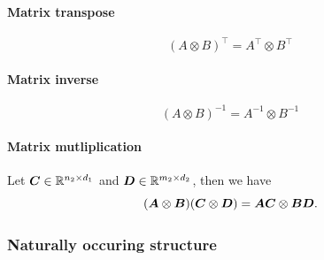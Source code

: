 \paragraph{Matrix transpose}
$$ (A \otimes B)^{\top} = A^{\top} \otimes B^{\top} $$

\paragraph{Matrix inverse}
$$ (A \otimes B)^{-1} = A^{-1} \otimes B^{-1} $$

\paragraph{Matrix mutliplication}
Let ${\bm{C}} \in \mathbb{R}^{n_2 \times d_1}$ and ${\bm{D}} \in \mathbb{R}^{m_2 \times d_2}$, then we have
$$ ({\bm{A}} \otimes {\bm{B}})({\bm{C}} \otimes {\bm{D}}) = {\bm{A}} {\bm{C}} \otimes {\bm{B}} {\bm{D}}. $$

\subsubsection{Naturally occuring structure}

